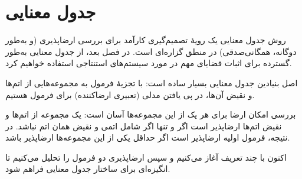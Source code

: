\section*{ جدول معنایی}

      روش جدول معنایی یک رویهٔ تصمیم‌گیری کارآمد برای بررسی ارضاپذیری (و به‌طور دوگانه، همگانی‌صدقی) در منطق گزاره‌ای است.  
      در فصل بعد، از جدول معنایی به‌طور گسترده برای اثبات قضایای مهم در مورد سیستم‌های استنتاجی استفاده خواهیم کرد.
      
      اصل بنیادین جدول معنایی بسیار ساده است:  
      با تجزیهٔ فرمول به مجموعه‌هایی از اتم‌ها و نقیض آن‌ها، در پی یافتن مدلی (تعبیری ارضاکننده) برای فرمول هستیم.
      
      بررسی امکان ارضا برای هر یک از این مجموعه‌ها آسان است:  
      یک مجموعه از اتم‌ها و نقیض اتم‌ها ارضاپذیر است اگر و تنها اگر شامل اتمی و نقیض همان اتم نباشد.  
      در نتیجه، فرمول اولیه ارضاپذیر است اگر حداقل یکی از این مجموعه‌ها ارضاپذیر باشد.
      
      اکنون با چند تعریف آغاز می‌کنیم و سپس ارضاپذیری دو فرمول را تحلیل می‌کنیم تا انگیزه‌ای برای ساختار جدول معنایی فراهم شود.




